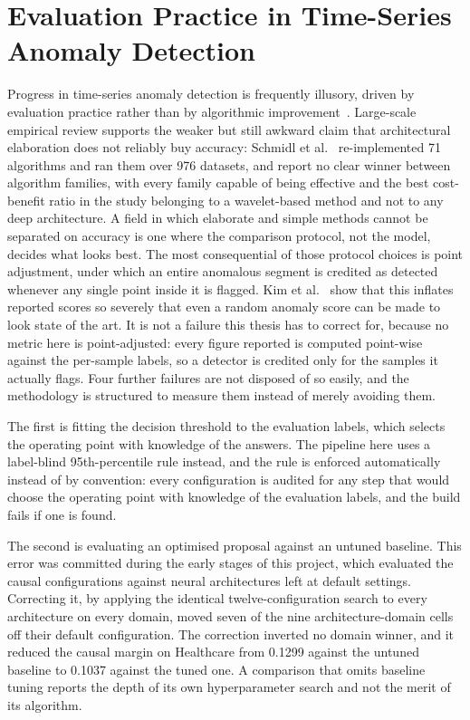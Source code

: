 \section{Evaluation Practice in Time-Series Anomaly Detection}
\label{sec:rel-evaluation}

Progress in time-series anomaly detection is frequently illusory, driven by evaluation practice rather than by algorithmic improvement~\cite{wu2023flawed}. Large-scale empirical review supports the weaker but still awkward claim that architectural elaboration does not reliably buy accuracy: Schmidl et al.~\cite{schmidl2022anomaly} re-implemented 71 algorithms and ran them over 976 datasets, and report no clear winner between algorithm families, with every family capable of being effective and the best cost-benefit ratio in the study belonging to a wavelet-based method and not to any deep architecture. A field in which elaborate and simple methods cannot be separated on accuracy is one where the comparison protocol, not the model, decides what looks best. The most consequential of those protocol choices is point adjustment, under which an entire anomalous segment is credited as detected whenever any single point inside it is flagged. Kim et al.~\cite{kim2022rigorous} show that this inflates reported scores so severely that even a random anomaly score can be made to look state of the art. It is not a failure this thesis has to correct for, because no metric here is point-adjusted: every figure reported is computed point-wise against the per-sample labels, so a detector is credited only for the samples it actually flags. Four further failures are not disposed of so easily, and the methodology is structured to measure them instead of merely avoiding them.

The first is fitting the decision threshold to the evaluation labels, which selects the operating point with knowledge of the answers. The pipeline here uses a label-blind 95th-percentile rule instead, and the rule is enforced automatically instead of by convention: every configuration is audited for any step that would choose the operating point with knowledge of the evaluation labels, and the build fails if one is found.

The second is evaluating an optimised proposal against an untuned baseline. This error was committed during the early stages of this project, which evaluated the causal configurations against neural architectures left at default settings. Correcting it, by applying the identical twelve-configuration search to every architecture on every domain, moved seven of the nine architecture-domain cells off their default configuration. The correction inverted no domain winner, and it reduced the causal margin on Healthcare from 0.1299 against the untuned baseline to 0.1037 against the tuned one. A comparison that omits baseline tuning reports the depth of its own hyperparameter search and not the merit of its algorithm.

